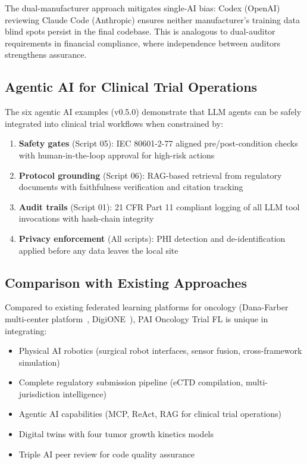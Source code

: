 The dual-manufacturer approach mitigates single-AI bias: Codex (OpenAI) reviewing Claude Code (Anthropic) ensures neither manufacturer's training data blind spots persist in the final codebase. This is analogous to dual-auditor requirements in financial compliance, where independence between auditors strengthens assurance.

\subsection{Agentic AI for Clinical Trial Operations}

The six agentic AI examples (v0.5.0) demonstrate that LLM agents can be safely integrated into clinical trial workflows when constrained by:
\begin{enumerate}
  \item \textbf{Safety gates} (Script 05): IEC 80601-2-77 aligned pre/post-condition checks with human-in-the-loop approval for high-risk actions~\cite{iec80601}
  \item \textbf{Protocol grounding} (Script 06): RAG-based retrieval from regulatory documents with faithfulness verification and citation tracking
  \item \textbf{Audit trails} (Script 01): 21 CFR Part 11 compliant logging of all LLM tool invocations with hash-chain integrity~\cite{cfr_part11}
  \item \textbf{Privacy enforcement} (All scripts): PHI detection and de-identification applied before any data leaves the local site
\end{enumerate}

\subsection{Comparison with Existing Approaches}

Compared to existing federated learning platforms for oncology (Dana-Farber multi-center platform~\cite{danafarberfederated2025}, DigiONE~\cite{digione2024}), PAI Oncology Trial FL is unique in integrating:
\begin{itemize}
  \item Physical AI robotics (surgical robot interfaces, sensor fusion, cross-framework simulation)
  \item Complete regulatory submission pipeline (eCTD compilation, multi-jurisdiction intelligence)
  \item Agentic AI capabilities (MCP, ReAct, RAG for clinical trial operations)
  \item Digital twins with four tumor growth kinetics models
  \item Triple AI peer review for code quality assurance
\end{itemize}

